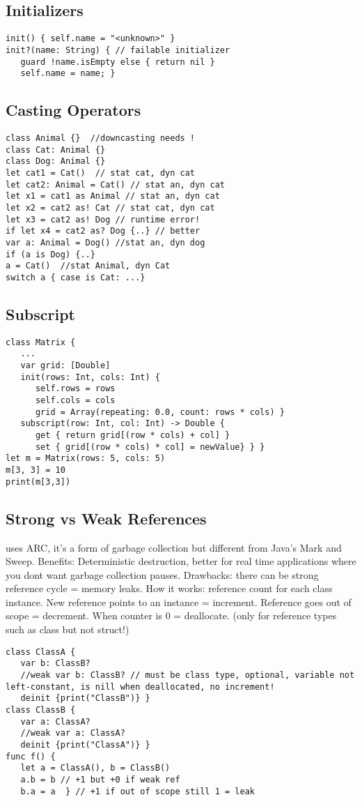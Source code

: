 \subsection{Initializers}
\begin{lstlisting}
init() { self.name = "<unknown>" }
init?(name: String) { // failable initializer
   guard !name.isEmpty else { return nil }
   self.name = name; }
\end{lstlisting}

\subsection{Casting Operators}
\begin{lstlisting}
class Animal {}  //downcasting needs !
class Cat: Animal {}
class Dog: Animal {}
let cat1 = Cat()  // stat cat, dyn cat
let cat2: Animal = Cat() // stat an, dyn cat
let x1 = cat1 as Animal // stat an, dyn cat
let x2 = cat2 as! Cat // stat cat, dyn cat
let x3 = cat2 as! Dog // runtime error!
if let x4 = cat2 as? Dog {..} // better
var a: Animal = Dog() //stat an, dyn dog
if (a is Dog) {..}
a = Cat()  //stat Animal, dyn Cat
switch a { case is Cat: ...}
\end{lstlisting}

\subsection{Subscript}
\begin{lstlisting}
class Matrix {
   ...
   var grid: [Double]
   init(rows: Int, cols: Int) {
      self.rows = rows
      self.cols = cols
      grid = Array(repeating: 0.0, count: rows * cols) }
   subscript(row: Int, col: Int) -> Double {
      get { return grid[(row * cols) + col] }
      set { grid[(row * cols) * col] = newValue} } }
let m = Matrix(rows: 5, cols: 5)
m[3, 3] = 10
print(m[3,3])
\end{lstlisting}

\subsection{Strong vs Weak References}
uses ARC, it's a form of garbage collection but different from Java's Mark and Sweep. Benefits: Deterministic destruction, better for real time applications where you dont want garbage collection pauses. Drawbacks: there can be strong reference cycle = memory leaks.
How it works: reference count for each class instance. New reference points to an instance = increment. Reference goes out of scope = decrement. When counter is 0 = deallocate. (only for reference types such as class but not struct!)
\begin{lstlisting}
class ClassA {
   var b: ClassB?
   //weak var b: ClassB? // must be class type, optional, variable not left-constant, is nill when deallocated, no increment!
   deinit {print("ClassB")} }
class ClassB {
   var a: ClassA?
   //weak var a: ClassA?
   deinit {print("ClassA")} }
func f() {
   let a = ClassA(), b = ClassB()
   a.b = b // +1 but +0 if weak ref
   b.a = a  } // +1 if out of scope still 1 = leak
\end{lstlisting}

